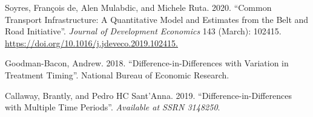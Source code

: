 \documentclass[10pt,a4paper]{article}
\begin{document}
\label{csl:17}Soyres, Fran{\c{c}}ois de, Alen Mulabdic, and Michele Ruta. 2020. ``{Common Transport Infrastructure: A Quantitative Model and Estimates from the Belt and Road Initiative}''. \textit{Journal of Development Economics} 143 (March): 102415. \url{https://doi.org/10.1016/j.jdeveco.2019.102415.}

\label{csl:18}Goodman-Bacon, Andrew. 2018. ``{Difference-in-Differences with Variation in Treatment Timing}''. National Bureau of Economic Research.

\label{csl:19}Callaway, Brantly, and Pedro HC Sant'Anna. 2019. ``{Difference-in-Differences with Multiple Time Periods}''. \textit{Available at SSRN 3148250}.
\end{document}
